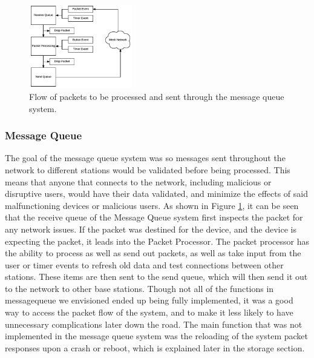 \documentclass[journal,compsoc]{IEEEtran}
\begin{document}
\begin{figure}[ht] 	%
\centering
\includegraphics[width=0.4\textwidth]{MessageQueueFlowchart.png}
\caption{ \space Flow of packets to be processed and sent through the message queue system.}
\label{Message Queue Flowchart}
\end{figure}

\subsubsection{Message Queue} 
The goal of the message queue system was so messages sent throughout the network to different stations would be validated before being processed. This means that anyone that connects to the network, including malicious or disruptive users, would have their data validated, and minimize the effects of said malfunctioning devices or malicious users. As shown in Figure \ref{Message Queue Flowchart}, it can be seen that the receive queue of the Message Queue system first inspects the packet for any network issues. If the packet was destined for the device, and the device is expecting the packet, it leads into the Packet Processor. The packet processor has the ability to process as well as send out packets, as well as take input from the user or timer events to refresh old data and test connections between other stations. These items are then sent to the send queue, which will then send it out to the network to other base stations. Though not all of the functions in messagequeue we envisioned ended up being fully implemented, it was a good way to access the packet flow of the system, and to make it less likely to have unnecessary complications later down the road. The main function that was not implemented in the message queue system was the reloading of the system packet responses upon a crash or reboot, which is explained later in the storage section.
\end{document}
